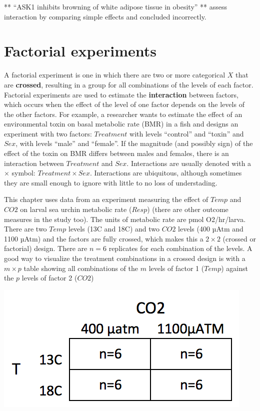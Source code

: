 \documentclass[]{book}
\begin{document}
** ``ASK1 inhibits browning of white adipose tissue in obesity'' ** assess interaction by comparing simple effects and concluded incorrectly.

\hypertarget{factorial-experiments}{%
\section{Factorial experiments}\label{factorial-experiments}}

A factorial experiment is one in which there are two or more categorical \(X\) that are \textbf{crossed}, resulting in a group for all combinations of the levels of each factor. Factorial experiments are used to estimate the \textbf{interaction} between factors, which occurs when the effect of the level of one factor depends on the levels of the other factors. For example, a researcher wants to estimate the effect of an environmental toxin on basal metabolic rate (BMR) in a fish and designs an experiment with two factors: \(Treatment\) with levels ``control'' and ``toxin'' and \(Sex\), with levels ``male'' and ``female''. If the magnitude (and possibly sign) of the effect of the toxin on BMR differs between males and females, there is an interaction between \(Treatment\) and \(Sex\). Interactions are usually denoted with a \(\times\) symbol: \(Treatment \times Sex\). Interactions are ubiquitous, although sometimes they are small enough to ignore with little to no loss of understading.

This chapter uses data from an experiment measuring the effect of \(Temp\) and \(CO2\) on larval sea urchin metabolic rate (\(Resp\)) (there are other outcome measures in the study too). The units of metabolic rate are pmol O2/hr/larva. There are two \(Temp\) levels (13C and 18C) and two \(CO2\) levels (400 µAtm and 1100 µAtm) and the factors are fully crossed, which makes this a \(2 \times 2\) (crossed or factorial) design. There are \(n=6\) replicates for each combination of the levels. A good way to visualize the treatment combinations in a crossed design is with a \(m \times p\) table showing all combinations of the \(m\) levels of factor 1 (\(Temp\)) against the \(p\) levels of factor 2 (\(CO2\))

\includegraphics{images/2x2_table.png}
\end{document}
